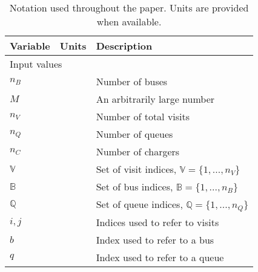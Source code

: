 \documentclass[utf8]{FrontiersinHarvard}
\begin{document}
\begin{table}[!htpb]
  \caption{Notation used throughout the paper. Units are provided when available.}
  \label{tab:variables}
  \centering
  \begin{tabularx}{\textwidth}{l l l}
    \toprule \textbf{Variable} & \textbf{Units} & \textbf{Description}                                                                      \\
    \toprule \multicolumn{3}{l}{Input values}                                                                                               \\
    \hline $n_B$ & & Number of buses                                                                                                        \\
    $M$           &       & An arbitrarily large number                                                                                     \\
    $n_V$         &       & Number of total visits                                                                                          \\
    $n_Q$         &       & Number of queues                                                                                                \\
    $n_C$         &       & Number of chargers                                                                                              \\
    $\mathbb{V}$  &       & Set of visit indices, $\mathbb{V} = \{1, ..., n_V\}$                                                            \\
    $\mathbb{B}$  &       & Set of bus indices, $\mathbb{B} = \{1, ..., n_B\}$                                                              \\
    $\mathbb{Q}$           &       & Set of queue indices, $\mathbb{Q} = \{1, ..., n_Q\}$                                                                     \\
    $i,j$         &       & Indices used to refer to visits                                                                                 \\
    $b$           &       & Index used to refer to a bus                                                                                    \\
    $q$           &       & Index used to refer to a queue                                                                                  \\

\end{tabularx}
\end{table}
\end{document}
